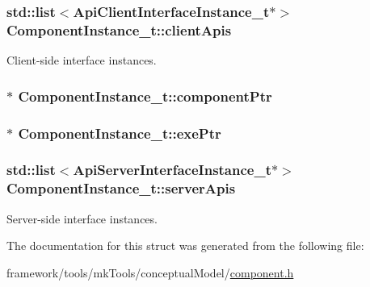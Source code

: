 \subsubsection[{\texorpdfstring{client\+Apis}{clientApis}}]{\setlength{\rightskip}{0pt plus 5cm}std\+::list$<${\bf Api\+Client\+Interface\+Instance\+\_\+t}$\ast$$>$ Component\+Instance\+\_\+t\+::client\+Apis}\hypertarget{struct_component_instance__t_ae3663edf33f2601bde3fc32937380910}{}\label{struct_component_instance__t_ae3663edf33f2601bde3fc32937380910}


Client-\/side interface instances. 

\subsubsection[{\texorpdfstring{component\+Ptr}{componentPtr}}]{$\ast$ Component\+Instance\+\_\+t\+::component\+Ptr}\hypertarget{struct_component_instance__t_a78005ef12b1438b3b84975c5ce1ad06d}{}\label{struct_component_instance__t_a78005ef12b1438b3b84975c5ce1ad06d}
\subsubsection[{\texorpdfstring{exe\+Ptr}{exePtr}}]{$\ast$ Component\+Instance\+\_\+t\+::exe\+Ptr}\hypertarget{struct_component_instance__t_a35f32834c27712e8133c7a3bf66b24d9}{}\label{struct_component_instance__t_a35f32834c27712e8133c7a3bf66b24d9}
\subsubsection[{\texorpdfstring{server\+Apis}{serverApis}}]{\setlength{\rightskip}{0pt plus 5cm}std\+::list$<${\bf Api\+Server\+Interface\+Instance\+\_\+t}$\ast$$>$ Component\+Instance\+\_\+t\+::server\+Apis}\hypertarget{struct_component_instance__t_a41d33b3670065c431e0361f3e0a76c12}{}\label{struct_component_instance__t_a41d33b3670065c431e0361f3e0a76c12}


Server-\/side interface instances. 



The documentation for this struct was generated from the following file\+:\begin{DoxyCompactItemize}
\item 
framework/tools/mk\+Tools/conceptual\+Model/\hyperlink{component_8h}{component.\+h}\end{DoxyCompactItemize}
